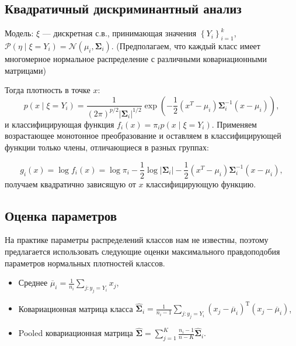 \documentclass{article}
\begin{document}
	\subsection{Квадратичный дискриминантный анализ}
	
	Модель: $\xi$ --- дискретная с.в., принимающая значения $\left\lbrace Y_i\right\rbrace_{i=1}^k$, $\mathcal P(\eta\mid \xi = Y_i) = \mathcal N\left(\mu_i, \bm{\Sigma}_i\right)$. (Предполагаем, что каждый класс имеет многомерное нормальное распределение с различными ковариационными матрицами)
	
	Тогда плотность в точке $x$:
	$$p\left(x\middle\vert \xi = Y_i\right) = \frac{1}{\left(2\pi\right)^{p/2}\left\vert\bm{\Sigma}_i\right\vert^{1/2}} \exp\left(-\frac{1}{2}{\left(x^T -\mu_i\right)}\bm{\Sigma}_i^{-1}\left(x -\mu_i\right)\right),$$
	и классифицирующая функция $f_i\left(x\right) = \pi_i p\left(x\middle\vert \xi = Y_i\right)$. Применяем возрастающее монотонное преобразование и оставляем в классифицирующей функции только члены, отличающиеся в разных группах:
	
	$$g_i\left(x\right) = \log f_i\left(x\right) = \log \pi_i - \frac{1}{2}\log\left\vert\bm{\Sigma}_i\right\vert -  \frac{1}{2}{\left(x^T -\mu_i\right)}\bm{\Sigma}_i^{-1}\left(x -\mu_i\right),$$
	получаем квадратично зависящую от $x$ классифицирующую функцию.
	
	\subsection{Оценка параметров}
	На практике параметры распределений классов нам не известны, поэтому предлагается использовать следующие оценки максимального правдоподобия параметров нормальных плотностей классов.
	\begin{itemize}
		\item Среднее
		$\overline{\mu}_i = \frac{1}{n_i}\sum\limits_{j: y_j = Y_i} x_j$,
		\item Ковариационная матрица класса $\widehat{\mathbf{\Sigma}}_i = \frac{1}{n_i - 1}\sum\limits_{j: y_j = Y_i} (x_j - \overline{\mu}_i)^\mathrm{T}(x_j - \overline{\mu}_i)$,
		\item Pooled ковариационная матрица $\widehat{\mathbf{\Sigma}}= \sum\limits_{j = 1}^K\frac{n_i - 1}{n - K} \widehat{\mathbf{\Sigma}}_i$.
	\end{itemize}
	
\end{document}
